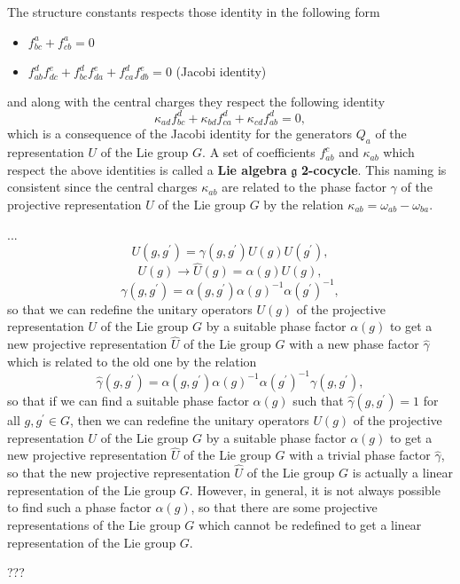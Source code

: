 The structure constants respects those identity in the following form
\begin{itemize}
    \item \(f^a_{bc} + f^a_{cb} = 0\)
    \item \(f^d_{ab} f^e_{dc} + f^d_{bc} f^e_{da} + f^d_{ca} f^e_{db} = 0\) (Jacobi identity)
\end{itemize}
and along with the central charges they respect the following identity
\[
    \kappa_{ad} f^d_{bc} + \kappa_{bd} f^d_{ca} + \kappa_{cd} f^d_{ab} = 0,
\]
which is a consequence of the Jacobi identity for the generators \(Q_a\) of the representation \(U\) of the Lie group \(G\). A set of coefficients \(f^c_{ab}\) and \(\kappa_{ab}\) which respect the above identities is called a \textbf{Lie algebra} \(\mathfrak{g}\) \textbf{2-cocycle}. This naming is consistent since the central charges \(\kappa_{ab}\) are related to the phase factor \(\gamma\) of the projective representation \(U\) of the Lie group \(G\) by the relation \(\kappa_{ab} = \omega_{ab} - \omega_{ba}\).

...
\[
    U(g,g^{\prime}) = \gamma(g,g^{\prime}) U(g)U(g^{\prime}),
\]
\[
    U(g) \to \hat{U}(g) = \alpha(g) U(g),
\]
\[
    \gamma(g,g^{\prime}) = \alpha(g, g^{\prime}) \alpha(g)^{-1} \alpha(g^{\prime})^{-1},
\]
so that we can redefine the unitary operators \(U(g)\) of the projective representation \(U\) of the Lie group \(G\) by a suitable phase factor \(\alpha(g)\) to get a new projective representation \(\hat{U}\) of the Lie group \(G\) with a new phase factor \(\hat{\gamma}\) which is related to the old one by the relation
\[
    \hat{\gamma}(g,g^{\prime}) = \alpha(g, g^{\prime}) \alpha(g)^{-1} \alpha(g^{\prime})^{-1} \gamma(g,g^{\prime}),
\]
so that if we can find a suitable phase factor \(\alpha(g)\) such that \(\hat{\gamma}(g,g^{\prime}) = 1\) for all \(g, g^{\prime} \in G\), then we can redefine the unitary operators \(U(g)\) of the projective representation \(U\) of the Lie group \(G\) by a suitable phase factor \(\alpha(g)\) to get a new projective representation \(\hat{U}\) of the Lie group \(G\) with a trivial phase factor \(\hat{\gamma}\), so that the new projective representation \(\hat{U}\) of the Lie group \(G\) is actually a linear representation of the Lie group \(G\). However, in general, it is not always possible to find such a phase factor \(\alpha(g)\), so that there are some projective representations of the Lie group \(G\) which cannot be redefined to get a linear representation of the Lie group \(G\).

???

